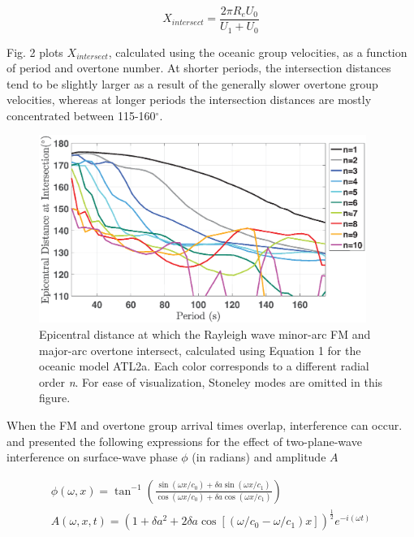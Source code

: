 \documentclass[extra,mreferee]{gji}
\begin{document}
\begin{equation}
X_{intersect} = \frac{2 \pi R_e U_{0}}{U_1 + U_{0}}
\end{equation}
     
Fig. 2 plots $X_{intersect}$, calculated using the oceanic group velocities, as a function of period and overtone number. At shorter periods, the intersection distances tend to be slightly larger as a result of the generally slower overtone group velocities, whereas at longer periods the intersection distances are mostly concentrated between 115-160$^\circ$. 
       
\begin{figure}
\centering
\includegraphics[width=0.95\textwidth]{Fig2_Sver.eps}
\caption{Epicentral distance at which the Rayleigh wave minor-arc FM and major-arc overtone intersect, calculated using Equation 1 for the oceanic model ATL2a. Each color corresponds to a different radial order \textit{n}. For ease of visualization, Stoneley modes are omitted in this figure. }
\end{figure}

When the FM and overtone group arrival times overlap, interference can occur. \citet{forsyth1975new} and \citet{thatcher1969higher} presented the following expressions for the effect of two-plane-wave interference on surface-wave phase $\phi$ (in radians) and amplitude $A$

\begin{subequations} 
\begin{align} 
\phi(\omega, x) = \tan^{-1} \left(\frac{\sin(\omega x/c_0) + \delta a \sin(\omega x/c_1) }{\cos(\omega x/c_0) + \delta a \cos(\omega x/c_1)} \right) \label{eqn: frobenius 7} \\ 
A(\omega, x,t) = (1 + \delta a^2 + 2 \delta a \cos[( \omega/c_0 - \omega/c_1)x])^{\frac{1}{2}} e^{-i ( \omega t)} \label{eqn: frobenius 8} 
\end{align} \end{subequations}
\end{document}
